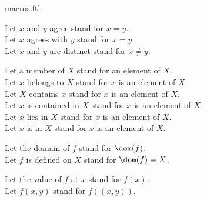 \documentclass{stex}
\begin{document}
\begin{smodule}{macros.ftl}
  \begin{forthel}
    Let $x$ and $y$ agree stand for $x = y$.\\
    Let $x$ agrees with $y$ stand for $x = y$.\\
    Let $x$ and $y$ are distinct stand for $x \neq y$.
  \end{forthel}
  
  \begin{forthel}
    Let a member of $X$ stand for an element of $X$.\\
    Let $x$ belongs to $X$ stand for $x$ is an element of $X$.\\
    Let $X$ contains $x$ stand for $x$ is an element of $X$.\\
    Let $x$ is contained in $X$ stand for $x$ is an element of $X$.\\
    Let $x$ lies in $X$ stand for $x$ is an element of $X$.\\
    Let $x$ is in $X$ stand for $x$ is an element of $X$.
  \end{forthel}
  
  \begin{forthel}
    Let the domain of $f$ stand for $\dom(f)$.\\
    Let $f$ is defined on $X$ stand for $\dom(f) = X$.
  \end{forthel}
  
  \begin{forthel}
    Let the value of $f$ at $x$ stand for $f(x)$.\\
    Let $f(x,y)$ stand for $f((x,y))$.
  \end{forthel}
\end{smodule}
\end{document}
